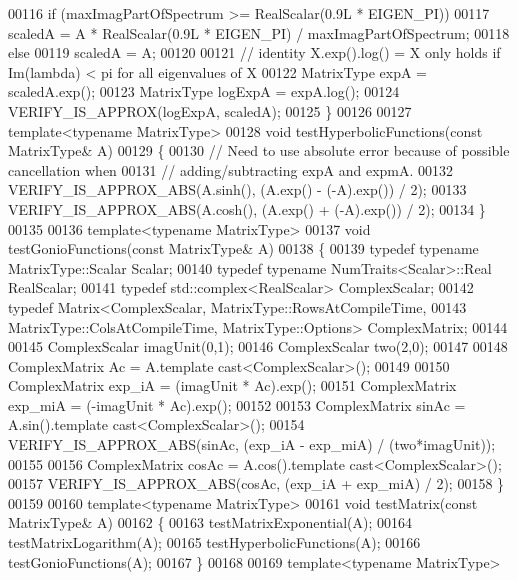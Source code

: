 \begin{DoxyCode}
00116   \textcolor{keywordflow}{if} (maxImagPartOfSpectrum >= RealScalar(0.9L * EIGEN\_PI))
00117     scaledA = A * RealScalar(0.9L * EIGEN\_PI) / maxImagPartOfSpectrum;
00118   \textcolor{keywordflow}{else}
00119     scaledA = A;
00120 
00121   \textcolor{comment}{// identity X.exp().log() = X only holds if Im(lambda) < pi for all eigenvalues of X}
00122   MatrixType expA = scaledA.exp();
00123   MatrixType logExpA = expA.log();
00124   VERIFY\_IS\_APPROX(logExpA, scaledA);
00125 \}
00126 
00127 \textcolor{keyword}{template}<\textcolor{keyword}{typename} MatrixType>
00128 \textcolor{keywordtype}{void} testHyperbolicFunctions(\textcolor{keyword}{const} MatrixType& A)
00129 \{
00130   \textcolor{comment}{// Need to use absolute error because of possible cancellation when}
00131   \textcolor{comment}{// adding/subtracting expA and expmA.}
00132   VERIFY\_IS\_APPROX\_ABS(A.sinh(), (A.exp() - (-A).exp()) / 2);
00133   VERIFY\_IS\_APPROX\_ABS(A.cosh(), (A.exp() + (-A).exp()) / 2);
00134 \}
00135 
00136 \textcolor{keyword}{template}<\textcolor{keyword}{typename} MatrixType>
00137 \textcolor{keywordtype}{void} testGonioFunctions(\textcolor{keyword}{const} MatrixType& A)
00138 \{
00139   \textcolor{keyword}{typedef} \textcolor{keyword}{typename} MatrixType::Scalar Scalar;
00140   \textcolor{keyword}{typedef} \textcolor{keyword}{typename} NumTraits<Scalar>::Real RealScalar;
00141   \textcolor{keyword}{typedef} std::complex<RealScalar> ComplexScalar;
00142   \textcolor{keyword}{typedef} Matrix<ComplexScalar, MatrixType::RowsAtCompileTime, 
00143                  MatrixType::ColsAtCompileTime, MatrixType::Options> ComplexMatrix;
00144 
00145   ComplexScalar imagUnit(0,1);
00146   ComplexScalar two(2,0);
00147 
00148   ComplexMatrix Ac = A.template cast<ComplexScalar>();
00149   
00150   ComplexMatrix exp\_iA = (imagUnit * Ac).exp();
00151   ComplexMatrix exp\_miA = (-imagUnit * Ac).exp();
00152   
00153   ComplexMatrix sinAc = A.sin().template cast<ComplexScalar>();
00154   VERIFY\_IS\_APPROX\_ABS(sinAc, (exp\_iA - exp\_miA) / (two*imagUnit));
00155   
00156   ComplexMatrix cosAc = A.cos().template cast<ComplexScalar>();
00157   VERIFY\_IS\_APPROX\_ABS(cosAc, (exp\_iA + exp\_miA) / 2);
00158 \}
00159 
00160 \textcolor{keyword}{template}<\textcolor{keyword}{typename} MatrixType>
00161 \textcolor{keywordtype}{void} testMatrix(\textcolor{keyword}{const} MatrixType& A)
00162 \{
00163   testMatrixExponential(A);
00164   testMatrixLogarithm(A);
00165   testHyperbolicFunctions(A);
00166   testGonioFunctions(A);
00167 \}
00168 
00169 \textcolor{keyword}{template}<\textcolor{keyword}{typename} MatrixType>

\end{DoxyCode}
